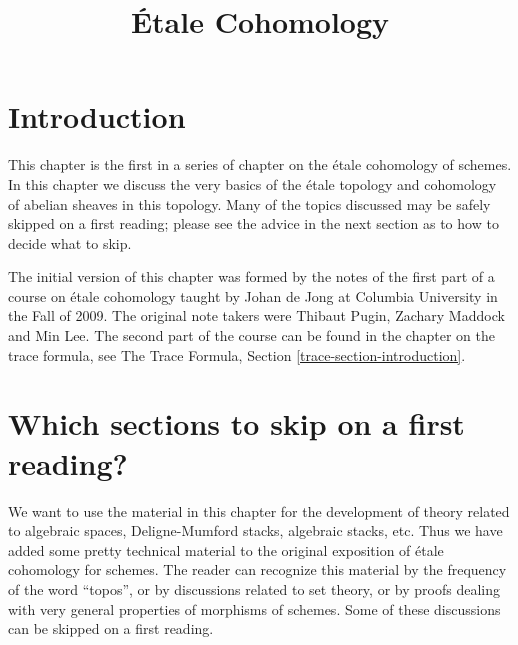 

%


\title{\'Etale Cohomology}


\maketitle

\label{section-phantom}

\tableofcontents


\section{Introduction}
\label{section-introduction}

\noindent
This chapter is the first in a series of chapter on the \'etale cohomology
of schemes. In this chapter we discuss the very basics of the \'etale
topology and cohomology of abelian sheaves in this topology. Many of the
topics discussed may be safely skipped on a first reading; please see
the advice in the next section as to how to decide what to skip.

\medskip\noindent
The initial version of this chapter was formed by the notes
of the first part of a course on \'etale cohomology taught by Johan de Jong
at Columbia University in the Fall of 2009. The original note takers were
Thibaut Pugin, Zachary Maddock and Min Lee. The second part of the
course can be found in the chapter on the trace formula, see
The Trace Formula, Section \ref{trace-section-introduction}.




\section{Which sections to skip on a first reading?}
\label{section-skip}

\noindent
We want to use the material in this chapter for the development of
theory related to algebraic spaces, Deligne-Mumford stacks, algebraic stacks,
etc. Thus we have added some pretty technical material to the original
exposition of \'etale cohomology for schemes. The reader can recognize this
material by the frequency of the word ``topos'', or by discussions related
to set theory, or by proofs dealing with very general properties of morphisms
of schemes. Some of these discussions can be skipped on a first reading.

